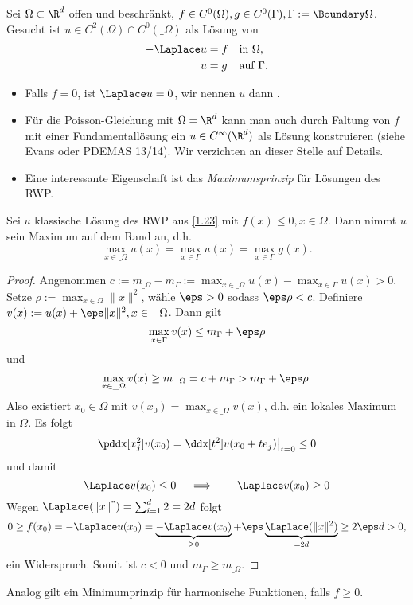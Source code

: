 \begin{df} \label{1.23}
	Sei $\Omega \subset \R^d$ offen und beschränkt, $f \in C^0(\Omega), g \in C^0(\Gamma), \Gamma := \Boundary \Omega$.
	Gesucht ist $u \in C^2(\Omega) \cap C^0(\_\Omega)$ als Lösung von
	\begin{align*}
		- \Laplace u &= f  && \text{in $\Omega$}, \\
		u &= g  && \text{auf $\Gamma$}.
	\end{align*}
	\begin{note}
		\begin{itemize}
			\item
				Falls $f = 0$, ist $\Laplace u = 0$, wir nennen $u$ dann .
			\item
				Für die Poisson-Gleichung mit $\Omega = \R^d$ kann man auch durch Faltung von $f$ mit einer Fundamentallösung ein $u \in C^\infty(\R^d)$ als Lösung konstruieren (siehe Evans oder PDEMAS 13/14).
				Wir verzichten an dieser Stelle auf Details.
			\item
				Eine interessante Eigenschaft ist das \emph{Maximumsprinzip} für Lösungen des RWP.
		\end{itemize}
	\end{note}
\end{df}

\begin{st} \label{1.24}
	Sei $u$ klassische Lösung des RWP aus \ref{1.23} mit $f(x) \le 0, x \in \Omega$.
	Dann nimmt $u$ sein Maximum auf dem Rand an, d.h.
	\[
		\max_{x\in \_\Omega} u(x) = \max_{x \in \Gamma} u(x) = \max_{x\in \Gamma} g(x).
	\]
	\begin{proof}
		Angenommen $c := m_{\_\Omega} - m_{\Gamma} := \max_{x\in \_\Omega} u(x) - \max_{x\in\Gamma} u(x) > 0$.
		Setze $\rho := \max_{x\in\Omega} \|x\|^2$, wähle $\eps > 0$ sodass $\eps \rho < c$.
		Definiere $v(x) := u(x) + \eps \|x\|^2, x \in \_\Omega$.
		Dann gilt
		\[
			\max_{x\in\Gamma} v(x) \le m_\Gamma + \eps \rho
		\]
		und
		\[
			\max_{x\in\_\Omega} v(x) \ge m_{\_\Omega} = c + m_\Gamma > m_\Gamma + \eps \rho.
		\]
		Also existiert $x_0 \in \Omega$ mit $v(x_0) = \max_{x\in \_\Omega} v(x)$, d.h. ein lokales Maximum in $\Omega$.
		Es folgt
		\[
			\pddx[x_j^2] v(x_0)
			= \ddx[t^2] v(x_0 + te_j) \big|_{t=0}
			\le 0
		\]
		und damit
		\[
			\Laplace v(x_0) \le 0
			\quad\implies\quad
			-\Laplace v(x_0) \ge 0
		\]
		Wegen $\Laplace(\|x\|^") = \sum_{i=1}^d 2 = 2d$ folgt
		\[
			0
			\ge f(x_0)
			= - \Laplace u(x_0)
			= \underbrace{- \Laplace v(x_0)}_{\ge 0} + \eps \underbrace{\Laplace (\|x\|^2)}_{=2d}
			\ge 2\eps d
			> 0,
		\]
		ein Widerspruch.
		Somit ist $c < 0$ und $m_\Gamma \ge m_{\_\Omega}$.
	\end{proof}
	\begin{note}
		Analog gilt ein Minimumprinzip für harmonische Funktionen, falls $f \ge 0$.
	\end{note}
\end{st}

